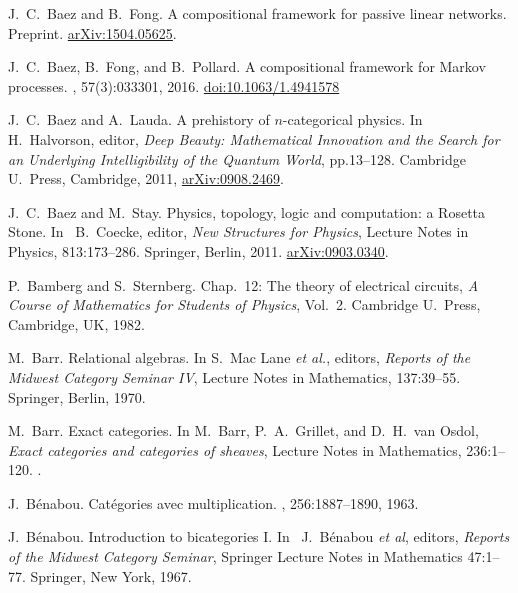 \begin{thebibliography}{RSW00}
    J.\ C.\ Baez and B.\ Fong. 
    \newblock A compositional framework for passive linear networks.
    \newblock Preprint. 
    \newblock \href{http://arxiv.org/abs/1504.05625}{arXiv:1504.05625}. 

    J.\ C.\ Baez, B.\ Fong, and B.\ Pollard. 
    \newblock A compositional framework for Markov processes.
    , 57(3):033301, 2016.  
    \newblock \href{http://dx.doi.org/10.1063/1.4941578}{doi:10.1063/1.4941578}

    J.\ C.\ Baez and A.\ Lauda.
    \newblock A prehistory of $n$-categorical
    physics. 
    \newblock In H.\ Halvorson, editor, {\em Deep Beauty: Mathematical Innovation and
    the Search for an Underlying Intelligibility of the Quantum World}, pp.13--128.
    \newblock Cambridge U.\ Press, Cambridge, 2011,  
    \newblock \href{http://arxiv.org/abs/0908.2469}{arXiv:0908.2469}.

    J.\ C.\ Baez and M.\ Stay. 
    \newblock Physics, topology, logic and 
    computation: a Rosetta Stone. 
    \newblock In \ B.\ Coecke, editor, {\sl New Structures for Physics}, 
    Lecture Notes in Physics, 813:173--286.
    \newblock Springer, Berlin, 2011.
    \newblock \href{http://arxiv.org/abs/0903.0340}{arXiv:0903.0340}.

    P.\ Bamberg and S.\ Sternberg. 
    \newblock Chap.\ 12: The theory of electrical circuits, {\em A Course of Mathematics for
    Students of Physics}, Vol.\ 2.
    Cambridge U.\ Press, Cambridge, UK, 1982. 
    
    M.\ Barr.
    \newblock Relational algebras.
    \newblock In S.\ Mac Lane \textit{et al.}, editors, {\sl Reports of the Midwest Category Seminar IV}, Lecture Notes in
    Mathematics, 137:39--55.
    \newblock Springer, Berlin, 1970.

    M.\ Barr.
    \newblock Exact categories.
    \newblock In M.\ Barr, P.\ A.\ Grillet, and D.\ H.\ van Osdol, {\em Exact categories and categories of sheaves}, Lecture Notes in
    Mathematics, 236:1--120.
    .

    J.\ B\'enabou.
    \newblock Cat\'egories avec multiplication. 
    , 256:1887--1890, 1963.

    J.\ B\'enabou.
    \newblock Introduction to bicategories I.
    \newblock In \ J.\ B\'enabou \textit{et al}, editors, \textsl{Reports
    of the Midwest Category Seminar}, Springer Lecture Notes in Mathematics { 47}:1--77.
    \newblock Springer, New York, 1967.


\end{thebibliography}
